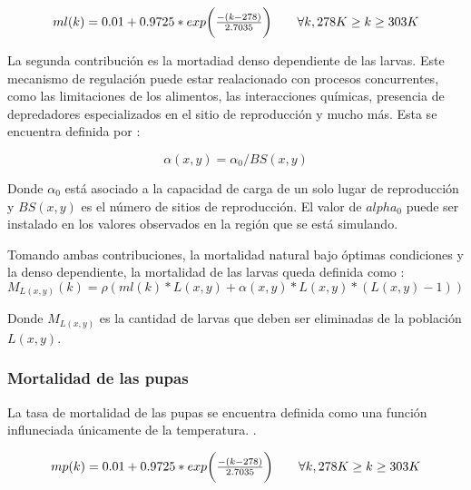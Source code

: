 \begin{equation}
\label{eq:mortalidad-natural-larvas}
 \begin{array}{l l}
    ml(k) = 0.01 + 0.9725 * exp\bigg( \frac{-(k - 278)}{2.7035}\bigg) &\quad  \forall k, 278 K \geq k \geq 303 K\\
\end{array}
\end{equation}

La segunda contribución es la mortadiad denso dependiente de las larvas. Este mecanismo de
regulación puede estar realacionado con procesos concurrentes, como las limitaciones de los
alimentos, las interacciones químicas, presencia de depredadores especializados en el sitio de
reproducción y mucho más\citep{otero2006stochastic}. Esta se encuentra definida por :

\begin{equation}
  \alpha (x,y) = \alpha _{0}/BS(x,y)
\end{equation}

Donde $\alpha _{0}$ está asociado a la capacidad de carga de un solo lugar de reproducción y
$BS(x,y)$ es el número de sitios de reproducción. El valor de $alpha _{0}$ puede ser instalado en
los valores observados en la región que se está simulando.

Tomando ambas contribuciones, la mortalidad natural bajo óptimas condiciones y la denso
dependiente, la mortalidad de las larvas queda definida como :
\begin{equation}
    M_{L(x,y)}(k) = \rho(ml(k) * L(x,y) + \alpha (x,y) * L(x,y) *(L(x,y) - 1))
\end{equation}

Donde $M_{L(x,y)}$ es la cantidad de larvas que deben ser eliminadas de la población $L(x,y)$.

\subsubsection{Mortalidad de las pupas}
La tasa de mortalidad de las pupas se encuentra definida como una función influneciada únicamente
de la temperatura. \citep{otero2006stochastic}.

\begin{equation}
 \begin{array}{l l}
    mp(k) = 0.01 + 0.9725 * exp\bigg( \frac{-(k - 278)}{2.7035}\bigg) &\quad  \forall k, 278 K \geq k \geq 303 K\\
\end{array}
\end{equation}

